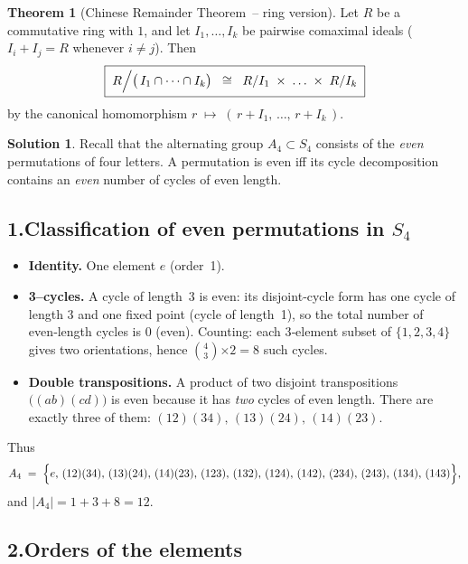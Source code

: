 \documentclass[12pt]{article}
\theoremstyle{definition} %
\newtheorem{solution}{Solution}
\newtheorem{theorem}{Theorem}
\theoremstyle{plain} %
\begin{document}
  \begin{theorem}[Chinese Remainder Theorem – ring version]
  \label{thm:CRT-rings}
  Let $R$ be a commutative ring with $1$, and let $I_{1},\dots,I_{k}$ be
  pairwise comaximal ideals
  ($I_{i}+I_{j}=R$ whenever $i\neq j$).
  Then
  \[
    \boxed{\;
      R\Bigl/\bigl(\,I_{1}\cap\dots\cap I_{k}\bigr)
      \;\;\cong\;\;
      R/I_{1}\;\times\;\dots\;\times\;R/I_{k}
    \;}
  \]
  by the canonical homomorphism
  \(
    r \;\mapsto\; (\,r+I_{1},\,\dots,\,r+I_{k}\,).
  \)
  \end{theorem}
\begin{solution}
  Recall that the alternating group
  \(
    A_{4}\subset S_{4}
  \)
  consists of the \emph{even} permutations of four letters.
  A permutation is even iff its cycle decomposition contains an \emph{even}
  number of cycles of even length.
  
  \subsection*{1.\;Classification of even permutations in $S_{4}$}
  \begin{itemize}
    \item \textbf{Identity.} One element \(e\) (order 1).
    \item \textbf{3–cycles.}  
          A cycle of length 3 is even:
          its disjoint‑cycle form has one cycle of length 3 and
          one fixed point (cycle of length 1), so the total number of even‑length
          cycles is \(0\) (even).
          Counting: each 3‑element subset of \(\{1,2,3,4\}\) gives two
          orientations, hence
          \(4\choose 3\)\(\times 2 = 8\) such cycles.
    \item \textbf{Double transpositions.}  
          A product of two disjoint transpositions
          \(\bigl((ab)(cd)\bigr)\) is even because it has \emph{two}
          cycles of even length.
          There are exactly three of them:
          \((12)(34),\,(13)(24),\,(14)(23)\).
  \end{itemize}
  
  Thus
  \[
    A_{4}\;=\;
    \Bigl\{
      e,\,
      (12)(34),\,(13)(24),\,(14)(23),\,
      (123),\,(132),\,(124),\,(142),\,(234),\,(243),\,(134),\,(143)
    \Bigr\},
  \]
  and \(|A_{4}|=1+3+8=12\).
  
  \subsection*{2.\;Orders of the elements}
  

\end{solution}
\end{document}
